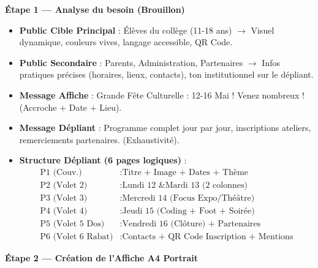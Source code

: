 \documentclass[11pt]{article}
\begin{document}
\begin{exoresolu}
\textbf{Étape 1 — Analyse du besoin (Brouillon)}

\begin{itemize}
    \item \textbf{Public Cible Principal} : Élèves du collège (11-18 ans) $\rightarrow$ Visuel dynamique, couleurs vives, langage accessible, QR Code.
    \item \textbf{Public Secondaire} : Parents, Administration, Partenaires $\rightarrow$ Infos pratiques précises (horaires, lieux, contacts), ton institutionnel sur le dépliant.
    \item \textbf{Message Affiche} : \og Grande Fête Culturelle : 12-16 Mai ! Venez nombreux ! \fg{} (Accroche + Date + Lieu).
    \item \textbf{Message Dépliant} : \og Programme complet jour par jour, inscriptions ateliers, remerciements partenaires. \fg{} (Exhaustivité).
    \item \textbf{Structure Dépliant (6 pages logiques)} :
    \begin{align*}
        \text{P1 (Couv.)} &: \text{Titre + Image + Dates + Thème} \\
        \text{P2 (Volet 2)} &: \text{Lundi 12 \& Mardi 13 (2 colonnes)} \\
        \text{P3 (Volet 3)} &: \text{Mercredi 14 (Focus Expo/Théâtre)} \\
        \text{P4 (Volet 4)} &: \text{Jeudi 15 (Coding + Foot + Soirée)} \\
        \text{P5 (Volet 5 Dos)} &: \text{Vendredi 16 (Clôture) + Partenaires} \\
        \text{P6 (Volet 6 Rabat)} &: \text{Contacts + QR Code Inscription + Mentions}
    \end{align*}
\end{itemize}

\textbf{Étape 2 — Création de l'Affiche A4 Portrait}


\end{exoresolu}
\end{document}
